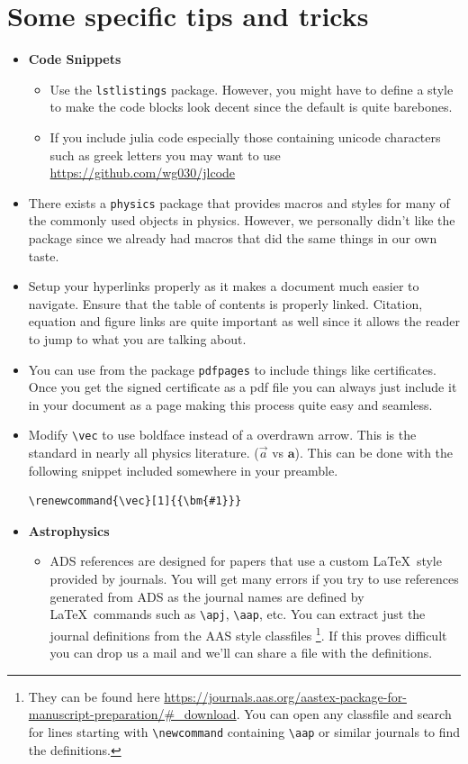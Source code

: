 \section{Some specific tips and tricks}
\begin{itemize}
	\item \textbf{Code Snippets}
	\begin{itemize}
		\item Use the \texttt{lstlistings} package. However, you might have to define a style to make the code blocks look decent since the default is quite barebones.
		\item If you include julia code especially those containing unicode characters such as greek letters you may want to use \url{https://github.com/wg030/jlcode}
	\end{itemize}
	\item There exists a \texttt{physics} package that provides macros and styles for many of the commonly used objects in physics. However, we personally didn't like the package since we already had macros that did the same things in our own taste.
	\item Setup your hyperlinks properly as it makes a document much easier to navigate. Ensure that the table of contents is properly linked. Citation, equation and figure links are quite important as well since it allows the reader to jump to what you are talking about.
	\item You can use \lstinline|| from the package \verb*|pdfpages| to include things like certificates. Once you get the signed certificate as a pdf file you can always just include it in your document as a page making this process quite easy and seamless.
	\item Modify \verb|\vec| to use boldface instead of a overdrawn arrow. This is the standard in nearly all physics literature. ($\vec{a}$ vs $\bm{a}$). This can be done with the following snippet included somewhere in your preamble.
	\begin{lstlisting}[style=mystyle]
\renewcommand{\vec}[1]{{\bm{#1}}}\end{lstlisting}
	\item \textbf{Astrophysics}
	\begin{itemize}
		\item ADS references are designed for papers that use a custom \LaTeX\ style provided by journals. You will get many errors if you try to use references generated from ADS as the journal names are defined by \LaTeX\ commands such as \verb*|\apj|, \verb*|\aap|, etc. You can extract just the journal definitions from the AAS style classfiles \footnote{They can be found here \url{https://journals.aas.org/aastex-package-for-manuscript-preparation/#_download}. You can open any classfile and search for lines starting with \verb*|\newcommand| containing \verb*|\aap| or similar journals to find the definitions.}. If this proves difficult you can drop us a mail and we'll can share a file with the definitions.

\end{itemize}
\end{itemize}
